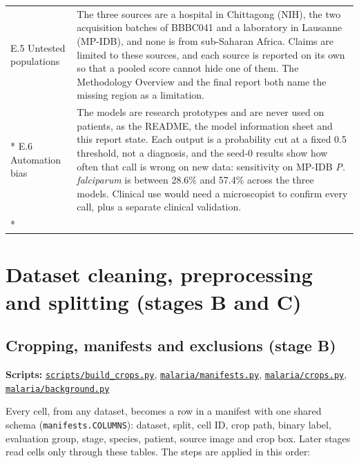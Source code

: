 \documentclass[11pt,a4paper]{article}
\begin{document}
{\begin{longtable}{@{}>{\raggedright\arraybackslash\hspace{0pt}}p{79.7pt}>{\raggedright\arraybackslash\hspace{0pt}}p{256.3pt}@{}}
E.5 Untested populations & The three sources are a hospital in Chittagong (NIH), the two acquisition batches of BBBC041 and a laboratory in Lausanne (MP-IDB), and none is from sub-Saharan Africa. Claims are limited to these sources, and each source is reported on its own so that a pooled score cannot hide one of them. The Methodology Overview and the final report both name the missing region as a limitation. \\*
E.6 Automation bias & The models are research prototypes and are never used on patients, as the README, the model information sheet and this report state. Each output is a probability cut at a fixed 0.5 threshold, not a diagnosis, and the seed-0 results show how often that call is wrong on new data: sensitivity on MP-IDB \emph{P. falciparum} is between 28.6\% and 57.4\% across the three models. Clinical use would need a microscopist to confirm every call, plus a separate clinical validation. \\*
\end{longtable}}

\section{Dataset cleaning, preprocessing and splitting (stages B and C)}

\subsection{Cropping, manifests and exclusions (stage B)}

\textbf{Scripts:} \href{https://gitlab.uvt.nl/capstone/2026-fall/u927271/-/blob/v1.0-final/scripts/build_crops.py}{\texttt{scripts/\allowbreak{}build\_\allowbreak{}crops.\allowbreak{}py}}, \href{https://gitlab.uvt.nl/capstone/2026-fall/u927271/-/blob/v1.0-final/malaria/manifests.py}{\texttt{malaria/\allowbreak{}manifests.\allowbreak{}py}}, \href{https://gitlab.uvt.nl/capstone/2026-fall/u927271/-/blob/v1.0-final/malaria/crops.py}{\texttt{malaria/\allowbreak{}crops.\allowbreak{}py}}, \href{https://gitlab.uvt.nl/capstone/2026-fall/u927271/-/blob/v1.0-final/malaria/background.py}{\texttt{malaria/\allowbreak{}background.\allowbreak{}py}}

Every cell, from any dataset, becomes a row in a manifest with one shared schema (\texttt{manifests.\allowbreak{}COLUMNS}): dataset, split, cell ID, crop path, binary label, evaluation group, stage, species, patient, source image and crop box. Later stages read cells only through these tables. The steps are applied in this order:
\end{document}
